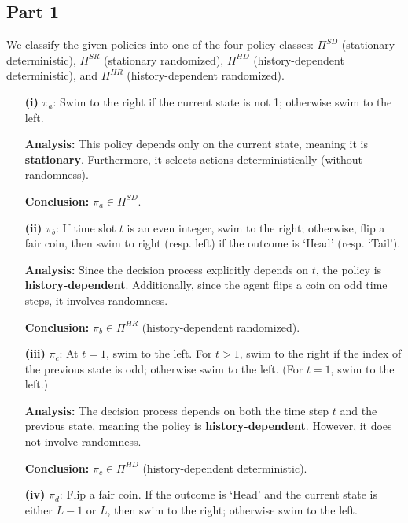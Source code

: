 \subsection*{Part 1}

We classify the given policies into one of the four policy classes: 
\(\Pi^{SD}\) (stationary deterministic), \(\Pi^{SR}\) (stationary randomized), 
\(\Pi^{HD}\) (history-dependent deterministic), and \(\Pi^{HR}\) (history-dependent randomized). 

\begin{enumerate}
    \item[\textbf{(i)}] \(\pi_a\): Swim to the right if the current state is not 1; otherwise swim to the left.
    
    \textbf{Analysis:} This policy depends only on the current state, meaning it is \textbf{stationary}. Furthermore, it selects actions deterministically (without randomness). 
    
    \textbf{Conclusion:} \(\pi_a \in \Pi^{SD}\).

    \item[\textbf{(ii)}] \(\pi_b\):  If time slot \(t\) is an even integer, swim to the right; otherwise, flip a fair coin, then swim to right (resp. left) if the outcome is ‘Head’ (resp. ‘Tail’).

    \textbf{Analysis:} Since the decision process explicitly depends on \(t\), the policy is \textbf{history-dependent}. Additionally, since the agent flips a coin on odd time steps, it involves randomness. 

    \textbf{Conclusion:} \(\pi_b \in \Pi^{HR}\) (history-dependent randomized).
    
    \item[\textbf{(iii)}] \(\pi_c\): At \(t=1\), swim to the left. For \(t>1\), swim to the right if the index of the previous state is odd; otherwise swim to the left. (For \(t=1\), swim to the left.)

    \textbf{Analysis:} The decision process depends on both the time step \(t\) and the previous state, meaning the policy is \textbf{history-dependent}. However, it does not involve randomness.

    \textbf{Conclusion:} \(\pi_c \in \Pi^{HD}\) (history-dependent deterministic).

    \item[\textbf{(iv)}] \(\pi_d\): Flip a fair coin. If the outcome is ‘Head’ and the current state is either \(L-1\) or \(L\), then swim to the right; otherwise swim to the left.


\end{enumerate}
